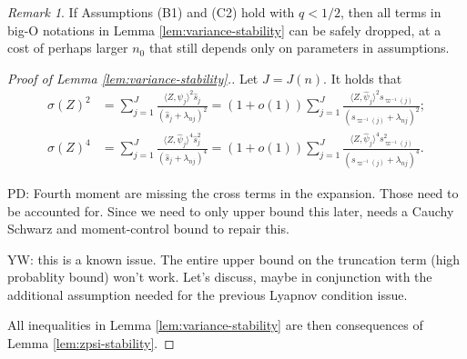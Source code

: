 \documentclass[11pt,a4paper]{article}
\renewcommand{\hat}{\widehat}
\theoremstyle{definition}
\theoremstyle{plain}
\theoremstyle{remark}
\newtheorem{remark}{Remark}[section]
\newcommand{\pd}[1]{
	{ \color{blue} PD: #1}
}
\begin{document}
\begin{remark}
If Assumptions (B1) and (C2) hold with $q<1/2$, then all terms in big-O notations in Lemma \ref{lem:variance-stability} can be safely dropped, at a cost of perhaps larger $n_0$ that still depends only on parameters in assumptions.
\end{remark}

\begin{proof}[Proof of Lemma \ref{lem:variance-stability}.]
Let $J=J(n)$.
It holds that
\begin{align*}
\sigma(Z)^2 &= \sum_{j=1}^J \frac{\langle Z,\hat\psi_j\rangle^2\hat s_j}{(\hat s_j+\lambda_{nj})^2} = (1+o(1))\sum_{j=1}^J\frac{\langle Z,\hat\psi_j\rangle^2 s_{\varpi^{-1}(j)}}{(s_{\varpi^{-1}(j)}+\lambda_{nj})^2};\\
\sigma(Z)^4 &= \sum_{j=1}^J\frac{\langle Z,\hat\psi_j\rangle^4\hat s_j^2}{(\hat s_j+\lambda_{nj})^4} = (1+o(1))\sum_{j=1}^J\frac{\langle Z,\hat\psi_j\rangle^4 s_{\varpi^{-1}(j)}^2}{(s_{\varpi^{-1}(j)}+\lambda_{nj})^4}.
\end{align*} 
\pd{Fourth moment are missing the cross terms in the expansion. Those need to be accounted for. Since we need to only upper bound this later, needs a Cauchy Schwarz and moment-control bound to repair this.}

{\color{red} YW: this is a known issue. The entire upper bound on the truncation term (high probablity bound) won't work. Let's discuss, maybe in conjunction with the additional assumption needed for the previous Lyapnov condition issue.}

All inequalities in Lemma \ref{lem:variance-stability} are then consequences of Lemma \ref{lem:zpsi-stability}.
\end{proof}
\end{document}
